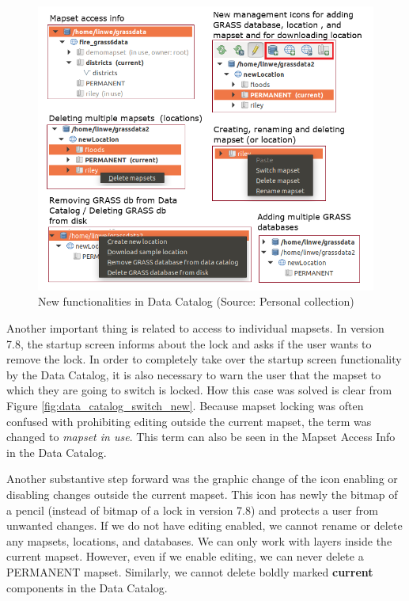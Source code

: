 \documentclass[a4paper,10pt,twoside]{article}
\begin{document}
\vspace{0.3cm}
\begin{figure}[hbt!] 
\begin{center}
\includegraphics[width=15cm]{../pictures/funkce.png} 
\caption[New functionalities in Data Catalog]{New functionalities in Data Catalog (Source: Personal collection)}
\label{fig:function}
\end{center}
\end{figure}

\newpage
\noindent Another important thing is related to access to individual mapsets. In version 7.8, the startup screen informs about the lock and asks if the user wants to remove the lock. In order to completely take over the startup screen functionality by the Data Catalog, it is also necessary to warn the user that the mapset to which they are going to switch is locked. How this case was solved is clear from Figure \ref{fig:data_catalog_switch_new}. Because mapset locking was often confused with prohibiting editing outside the current mapset, the term was changed to \textit{mapset in use}. This term can also be seen in the Mapset Access Info in the Data Catalog.

Another substantive step forward was the graphic change of the icon enabling or disabling changes outside the current mapset. This icon has newly the bitmap of a pencil (instead of bitmap of a lock in version 7.8) and protects a user from unwanted changes. If we do not have editing enabled, we cannot rename or delete any mapsets, locations, and databases. We can only work with layers inside the current mapset. However, even if we enable editing, we can never delete a PERMANENT mapset. Similarly, we cannot delete boldly marked \textbf{current} components in the Data Catalog.
\end{document}
